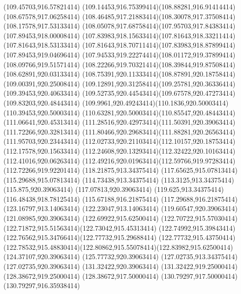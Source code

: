 {{	\lineto(109.45703,916.57821414)
	\curveto(109.14453,916.75399414)(108.88281,916.91414414)(108.67578,917.06258414)
	\curveto(108.46485,917.21883414)(108.30078,917.37508414)(108.17578,917.53133414)
	\curveto(108.05078,917.68758414)(107.95703,917.84383414)(107.89453,918.00008414)
	\curveto(107.83983,918.15633414)(107.81643,918.33211414)(107.81643,918.53133414)
	\curveto(107.81643,918.70711414)(107.83983,918.87899414)(107.89453,919.04696414)
	\curveto(107.94533,919.22274414)(108.01172,919.37899414)(108.09766,919.51571414)
	\curveto(108.22266,919.70321414)(108.39844,919.87508414)(108.62891,920.03133414)
	\curveto(108.75391,920.11333414)(108.87891,920.18758414)(109.00391,920.25008414)
	\curveto(109.12891,920.31258414)(109.25781,920.36336414)(109.39453,920.40633414)
	\curveto(109.52735,920.44543414)(109.67578,920.47273414)(109.83203,920.48443414)
	\curveto(109.9961,920.49243414)(110.1836,920.50003414)(110.39453,920.50003414)
	\curveto(110.63281,920.50003414)(110.85547,920.48443414)(111.06641,920.45313414)
	\curveto(111.28516,920.42973414)(111.50391,920.39063414)(111.72266,920.32813414)
	\curveto(111.80466,920.29683414)(111.88281,920.26563414)(111.95703,920.23443414)
	\curveto(112.02733,920.21103414)(112.10157,920.18753414)(112.17578,920.15633414)
	\curveto(112.24608,920.13293414)(112.32422,920.10163414)(112.41016,920.06263414)
	\curveto(112.49216,920.01963414)(112.59766,919.97283414)(112.72266,919.92201414)
	\closepath
	\moveto(118.21875,913.34375414)
	\lineto(117.65625,915.07813414)
	\lineto(115.29688,915.07813414)
	\lineto(114.73438,913.34375414)
	\lineto(113.3125,913.34375414)
	\lineto(115.875,920.39063414)
	\lineto(117.07813,920.39063414)
	\lineto(119.625,913.34375414)
	\closepath
	\moveto(116.48438,918.78125414)
	\lineto(115.67188,916.21875414)
	\lineto(117.29688,916.21875414)
	\closepath
	\moveto(123.16797,913.14063414)
	\lineto(122.23047,913.14063414)
	\lineto(119.60547,920.39063414)
	\lineto(121.08985,920.39063414)
	\lineto(122.69922,915.62500414)
	\curveto(122.70722,915.57030414)(122.71872,915.51563414)(122.73042,915.45313414)
	\curveto(122.74992,915.39843414)(122.76562,915.34766414)(122.77732,915.29688414)
	\lineto(122.77732,915.43750414)
	\curveto(122.78532,915.48830414)(122.80862,915.55078414)(122.83982,915.62500414)
	\lineto(124.37107,920.39063414)
	\lineto(125.77732,920.39063414)
	\closepath
	\moveto(127.02735,913.34375414)
	\lineto(127.02735,920.39063414)
	\lineto(131.32422,920.39063414)
	\lineto(131.32422,919.25000414)
	\lineto(128.38672,919.25000414)
	\lineto(128.38672,917.50000414)
	\lineto(130.79297,917.50000414)
	\lineto(130.79297,916.35938414)
}}
